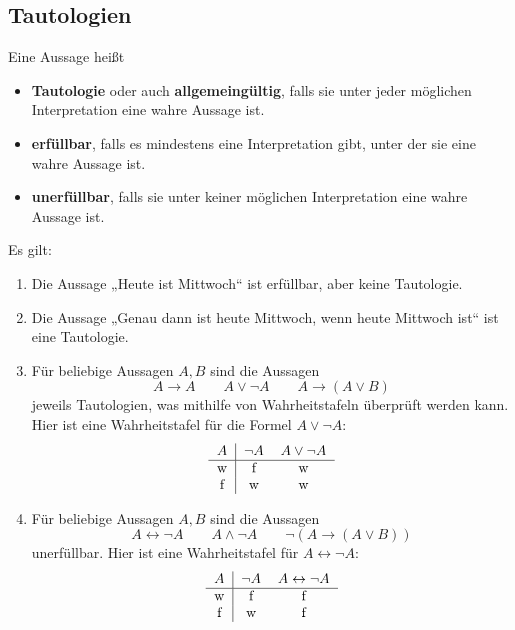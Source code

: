 \subsection*{Tautologien}


\begin{de} 
    Eine Aussage heißt
    \begin{itemize}
        \item \textbf{Tautologie} oder auch \textbf{allgemeingültig}, falls sie unter jeder möglichen Interpretation eine wahre Aussage ist.
        \item \textbf{erfüllbar}, falls es mindestens eine Interpretation gibt, unter der sie eine wahre Aussage ist.
        \item \textbf{unerfüllbar}, falls sie unter keiner möglichen Interpretation eine wahre Aussage ist.
    \end{itemize}
\end{de}


\begin{bsp}
    Es gilt:
    \begin{enumerate}
        \item Die Aussage „Heute ist Mittwoch“ ist erfüllbar, aber keine Tautologie.
        \item Die Aussage „Genau dann ist heute Mittwoch, wenn heute Mittwoch ist“ ist eine Tautologie.
        \item Für beliebige Aussagen $A,B$ sind die Aussagen
            \[ A \to A \qquad A\lor \neg A  \qquad A \to (A\lor B) \]
        jeweils Tautologien, was mithilfe von Wahrheitstafeln überprüft werden kann. Hier ist eine Wahrheitstafel für die Formel $A\lor \neg A$:
        \[\begin{tabular}{c|cc}
            $A$ & $\neg A$ & $A\lor \neg A$ \\
            \hline
            w&f&w\\
            f&w&w
        \end{tabular}\]
        \item Für beliebige Aussagen $A,B$ sind die Aussagen
            \[ A \leftrightarrow \neg A \qquad A\land \neg A \qquad  \neg(A\to (A\lor B))\]
        unerfüllbar. Hier ist eine Wahrheitstafel für $A\leftrightarrow \neg A$:
        \[\begin{tabular}{c|cc}
            $A$ &  $\neg A$ & $A \leftrightarrow \neg A$ \\
            \hline
            w&f&f\\
            f&w&f
        \end{tabular}\]
    \end{enumerate}
\end{bsp}
 
